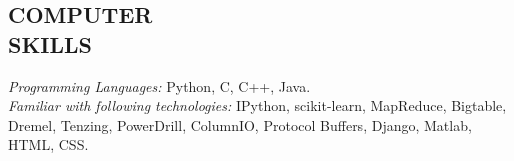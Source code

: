 \documentclass[margin, 2pt]{res} %
\begin{document}
\begin{resume}
\section{COMPUTER \\ SKILLS} 

{\sl Programming Languages:} 
Python, C, C++, Java. \\
{\sl Familiar with following technologies:} IPython, scikit-learn, MapReduce, Bigtable, Dremel, Tenzing, PowerDrill, ColumnIO, Protocol Buffers, Django, Matlab, HTML, CSS. 


\end{resume}
\end{document}
